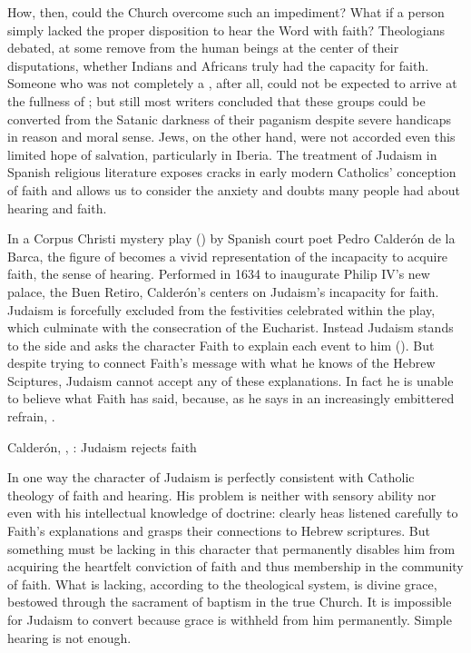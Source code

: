 How, then, could the Church overcome such an impediment?
What if a person simply lacked the proper disposition to hear the Word with faith?
Theologians debated, at some remove from the human beings at the center of their disputations, whether Indians and Africans truly had the capacity for faith.%
\citXXX[Pagden?]
Someone who was not completely a , after all, could not be expected to arrive at the fullness of ; but still most writers concluded that these groups could be converted from the Satanic darkness of their paganism despite severe handicaps in reason and moral sense.
Jews, on the other hand, were not accorded even this limited hope of salvation, particularly in Iberia.%
\citXXX[Nemiroff?]
The treatment of Judaism in Spanish religious literature exposes cracks in early modern Catholics' conception of faith and allows us to consider the anxiety and doubts many people had about hearing and faith.

In a Corpus Christi mystery play () by Spanish court poet Pedro Calderón de la Barca, the figure of  becomes a vivid representation of the incapacity to acquire faith,  the sense of hearing.
Performed in 1634 to inaugurate Philip IV's new palace, the Buen Retiro, Calderón's  centers on Judaism's incapacity for faith.%
\autocite{Calderon:Retiro}
Judaism is forcefully excluded from the festivities celebrated within the play, which culminate with the consecration of the Eucharist.
Instead Judaism stands to the side and asks the character Faith to explain each event to him ().
But despite trying to connect Faith's message with what he knows of the Hebrew Sciptures, Judaism cannot accept any of these explanations.
In fact he is unable to believe what Faith has said, because, as he says in an increasingly embittered refrain, .

\begin{expoem}
    \caption{Calderón, , : Judaism rejects faith}
    \label{expoem:Calderon-Retiro-Judaismo}
\end{expoem}

In one way the character of Judaism is perfectly consistent with Catholic theology of faith and hearing.
His problem is neither with sensory ability nor even with his intellectual knowledge of doctrine: clearly heas listened carefully to Faith's explanations and grasps their connections to Hebrew scriptures.
But something must be lacking in this character that permanently disables him from acquiring the heartfelt conviction of faith and thus membership in the community of faith.
What is lacking, according to the theological system, is divine grace, bestowed through the sacrament of baptism in the true Church.
It is impossible for Judaism to convert because grace is withheld from him permanently.%
Simple hearing is not enough.

